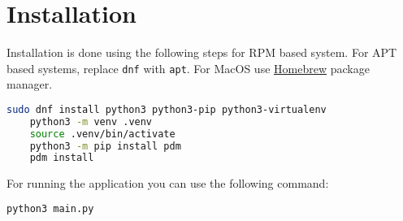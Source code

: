 \section{Installation}

Installation is done using the following steps for RPM based system. For APT based systems, replace \texttt{dnf} with \texttt{apt}. 
For MacOS use \href{https://brew.sh/}{Homebrew} package manager.
\begin{lstlisting}[language=bash]
    sudo dnf install python3 python3-pip python3-virtualenv
    python3 -m venv .venv
    source .venv/bin/activate
    python3 -m pip install pdm
    pdm install
\end{lstlisting}

For running the application you can use the following command:
\begin{lstlisting}[language=bash]
    python3 main.py
\end{lstlisting}
